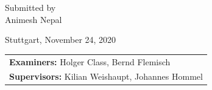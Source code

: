 \vspace{7cm}

\begin{center}
  {\normalsize Submitted by}\\[0.1cm]
  {\large Animesh Nepal}\\[0.1cm]
\end{center}

\vspace{3cm}

\begin{center}
  {\large Stuttgart, November 24, 2020}
\end{center}

\vspace{0.5cm}

\begin{center}
  {\large 
  \begin{tabular}{l}
  \textbf{Examiners:} Holger Class, Bernd Flemisch\\
  \textbf{Supervisors:} Kilian Weishaupt, Johannes Hommel
  \end{tabular}
  }\\[0.1cm]
\end{center}

\endinput